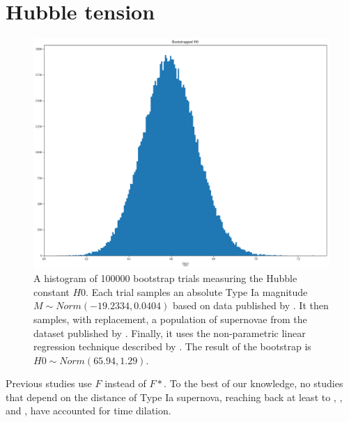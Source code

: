 \documentclass{article}
\begin{document}
\section{Hubble tension}
\label{sec:tension}

\begin{figure}[ht]
  \includegraphics[width=\linewidth]{bootstrapped_H0.png}
  \caption{A histogram of 100000 bootstrap trials measuring the Hubble constant
  $H0$. Each trial samples an absolute Type Ia magnitude $M \sim Norm(-19.2334,
  0.0404)$ based on data published by \citet{camarena2020}. It then samples,
  with replacement, a population of supernovae from the dataset published by
  \citet{abbott2024}. Finally, it uses the non-parametric linear regression
  technique described by \citet{siegel1982}. The result of the bootstrap is $H0
  \sim Norm(65.94, 1.29)$.
  }
\end{figure}

Previous studies use $F$ instead of $F*$. To the best of our knowledge, no
studies that depend on the distance of Type Ia supernova, reaching back at
least to \citet{kim1996}, \citet{riess1998}, and \citet{perlmutter1999}, have
accounted for time dilation.



\end{document}
